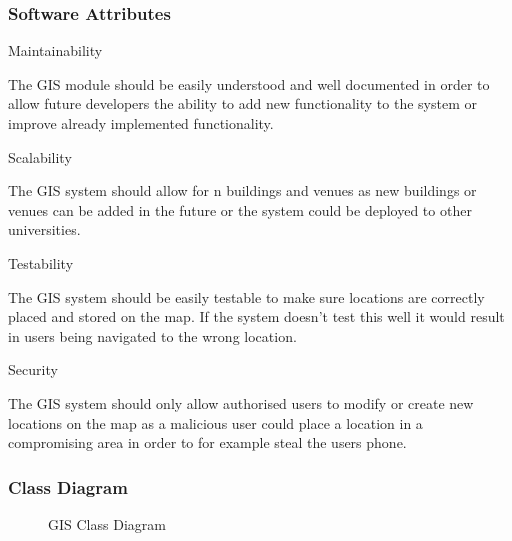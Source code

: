 \subsubsection{Software Attributes}
	
Maintainability

The GIS module should be easily understood and well documented in order to allow future developers the ability to add new functionality to the system or improve already implemented functionality.

Scalability

The GIS system should allow for n buildings and venues as new buildings or venues can be added in the future or the system could be deployed to other universities.

Testability

The GIS system should be easily testable to make sure locations are correctly placed and stored on the map. If the system doesn't test this well it would result in users being navigated to the wrong location.

Security

The GIS system should only allow authorised users to modify or create new locations on the map as a malicious user could place a location in a compromising area in order to for example steal the users phone.
 

\subsubsection{Class Diagram}

	\begin{figure}[h!]


\caption{GIS Class Diagram}

	\end{figure}